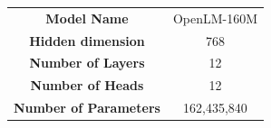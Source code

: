 \centering
    \resizebox{0.99\linewidth}{!}
    {
    \begin{tabular}{c|c}
    \toprule[1.5pt]
      {\bf Model Name} & OpenLM-160M\\
      {\bf Hidden dimension} & 768\\
      {\bf Number of  Layers} & 12\\
      {\bf Number of  Heads} & 12\\
      {\bf Number of  Parameters} & 162,435,840\\
        \bottomrule[1pt]
    \end{tabular}
        }